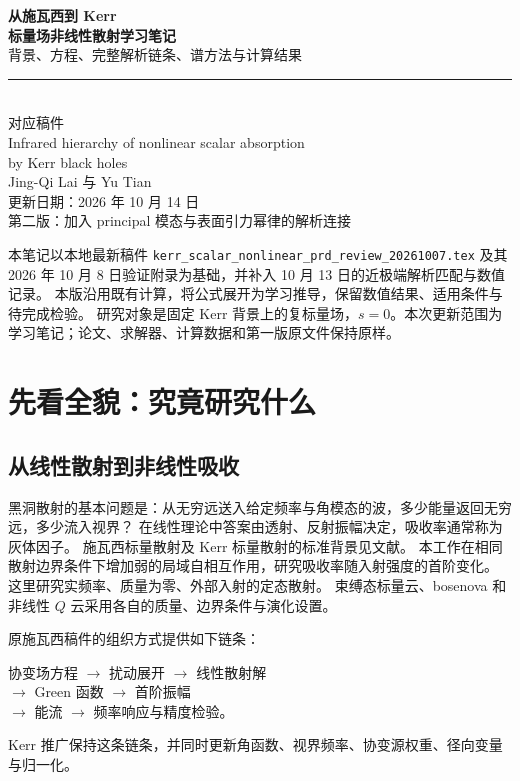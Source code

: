 \documentclass[UTF8,fontset=fandol,11pt,a4paper]{ctexart}
\numberwithin{equation}{section}
\begin{document}
\begin{titlepage}
\vspace*{16mm}
\begin{center}
{\Huge\bfseries 从施瓦西到 Kerr}\\[7mm]
{\LARGE\bfseries 标量场非线性散射学习笔记}\\[7mm]
{\large 背景、方程、完整解析链条、谱方法与计算结果}\\[15mm]
\rule{.86\textwidth}{.6pt}\\[7mm]
{\large 对应稿件}\\[3mm]
{\Large Infrared hierarchy of nonlinear scalar absorption\\by Kerr black holes}\\[5mm]
{\large Jing-Qi Lai 与 Yu Tian}\\[12mm]
更新日期：2026 年 10 月 14 日\\[3mm]
第二版：加入 principal 模态与表面引力幂律的解析连接
\end{center}
\vfill
\begin{remarkbox}
本笔记以本地最新稿件 \texttt{kerr\_scalar\_nonlinear\_prd\_review\_20261007.tex}
及其 2026 年 10 月 8 日验证附录为基础，并补入 10 月 13 日的近极端解析匹配与数值记录。
本版沿用既有计算，将公式展开为学习推导，保留数值结果、适用条件与待完成检验。
研究对象是固定 Kerr 背景上的复标量场，$s=0$。本次更新范围为学习笔记；论文、求解器、计算数据和第一版原文件保持原样。
\end{remarkbox}
\end{titlepage}
\tableofcontents\clearpage

\section{先看全貌：究竟研究什么}
\subsection{从线性散射到非线性吸收}
黑洞散射的基本问题是：从无穷远送入给定频率与角模态的波，多少能量返回无穷远，多少流入视界？
在线性理论中答案由透射、反射振幅决定，吸收率通常称为灰体因子。
施瓦西标量散射及 Kerr 标量散射的标准背景见文献\cite{Sanchez1976,Futterman,GlampedakisAndersson2001}。
本工作在相同散射边界条件下增加弱的局域自相互作用，研究吸收率随入射强度的首阶变化。
这里研究实频率、质量为零、外部入射的定态散射。
束缚态标量云、bosenova 和非线性 $Q$ 云\cite{YoshinoKodama2012,Baryakhtar2021,HerdeiroQCloud2014}采用各自的质量、边界条件与演化设置。

原施瓦西稿件的组织方式\cite{HeTianZhangManuscript2026}提供如下链条：
\begin{center}
协变场方程 $\longrightarrow$ 扰动展开 $\longrightarrow$ 线性散射解\\
$\longrightarrow$ Green 函数 $\longrightarrow$ 首阶振幅\\
$\longrightarrow$ 能流 $\longrightarrow$ 频率响应与精度检验。
\end{center}
Kerr 推广保持这条链条，并同时更新角函数、视界频率、协变源权重、径向变量与归一化。
\end{document}

